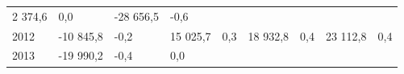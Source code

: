 \begin{longtable}[]{@{}lllllllll@{}}
\begin{minipage}[t]{0.12\columnwidth}
2 374,6\strut
\end{minipage} & \begin{minipage}[t]{0.06\columnwidth}\raggedright
0,0\strut
\end{minipage} & \begin{minipage}[t]{0.08\columnwidth}\raggedright
-28 656,5\strut
\end{minipage} & \begin{minipage}[t]{0.06\columnwidth}\raggedright
-0,6\strut
\end{minipage}\tabularnewline
\begin{minipage}[t]{0.05\columnwidth}\raggedright
2012\strut
\end{minipage} & \begin{minipage}[t]{0.10\columnwidth}\raggedright
-10 845,8\strut
\end{minipage} & \begin{minipage}[t]{0.06\columnwidth}\raggedright
-0,2\strut
\end{minipage} & \begin{minipage}[t]{0.17\columnwidth}\raggedright
15 025,7\strut
\end{minipage} & \begin{minipage}[t]{0.06\columnwidth}\raggedright
0,3\strut
\end{minipage} & \begin{minipage}[t]{0.12\columnwidth}\raggedright
18 932,8\strut
\end{minipage} & \begin{minipage}[t]{0.06\columnwidth}\raggedright
0,4\strut
\end{minipage} & \begin{minipage}[t]{0.08\columnwidth}\raggedright
23 112,8\strut
\end{minipage} & \begin{minipage}[t]{0.06\columnwidth}\raggedright
0,4\strut
\end{minipage}\tabularnewline
\begin{minipage}[t]{0.05\columnwidth}\raggedright
2013\strut
\end{minipage} & \begin{minipage}[t]{0.10\columnwidth}\raggedright
-19 990,2\strut
\end{minipage} & \begin{minipage}[t]{0.06\columnwidth}\raggedright
-0,4\strut
\end{minipage} & \begin{minipage}[t]{0.17\columnwidth}\raggedright
0,0\strut
\end{minipage} & \begin{minipage}[t]{0.06\columnwidth}\raggedright

\end{minipage}
\end{longtable}
